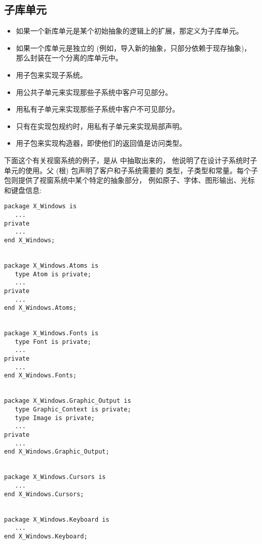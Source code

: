 \subsection{子库单元}
\label{c:prog-struct:high-level:child-lib-unit}
\begin{itemize}
\item 如果一个新库单元是某个初始抽象的逻辑上的扩展，那定义为子库单元。
\item 如果一个库单元是独立的 (例如，导入新的抽象，只部分依赖于现存抽象)，
那么封装在一个分离的库单元中。
\item 用子包来实现子系统。
\item 用公共子单元来实现那些子系统中客户可见部分。
\item 用私有子单元来实现那些子系统中客户不可见部分。
\item 只有在实现包规约时，用私有子单元来实现局部声明。
\item 用子包来实现构造器，即使他们的返回值是访问类型。
\end{itemize}

\begin{blockindent}
下面这个有关视窗系统的例子，是从 \cite{cohen93} 中抽取出来的，
他说明了在设计子系统时子单元的使用。父 (根) 包声明了客户和子系统需要的
类型，子类型和常量。每个子包则提供了视窗系统中某个特定的抽象部分，
例如原子、字体、图形输出、光标和键盘信息:
\begin{lstlisting}
package X_Windows is
   ...
private
   ...
end X_Windows;


package X_Windows.Atoms is
   type Atom is private;
   ...
private
   ...
end X_Windows.Atoms;


package X_Windows.Fonts is
   type Font is private;
   ...
private
   ...
end X_Windows.Fonts;


package X_Windows.Graphic_Output is
   type Graphic_Context is private;
   type Image is private;
   ...
private
   ...
end X_Windows.Graphic_Output;


package X_Windows.Cursors is
   ...
end X_Windows.Cursors;


package X_Windows.Keyboard is
   ...
end X_Windows.Keyboard;
\end{lstlisting}
\end{blockindent}

